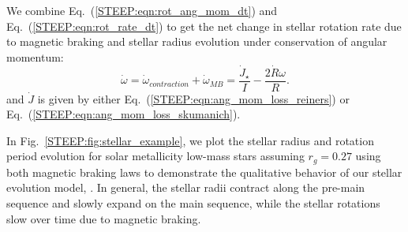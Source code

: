 We combine Eq.~(\ref{STEEP:eqn:rot_ang_mom_dt}) and Eq.~(\ref{STEEP:eqn:rot_rate_dt}) to get the net change in stellar rotation rate due to magnetic braking and stellar radius evolution under conservation of angular momentum:
\begin{equation} \label{STEEP:eqn:stellar_rot_rate_dt}
\dot{\omega} = \dot{\omega}_{contraction} + \dot{\omega}_{MB} = \frac{\dot{J}_{\star}}{I} - \frac{2 \dot{R} \omega}{R}.
\end{equation}
and $\dot{J}$ is given by either Eq.~(\ref{STEEP:eqn:ang_mom_loss_reiners}) or Eq.~(\ref{STEEP:eqn:ang_mom_loss_skumanich}).

In Fig.~\ref{STEEP:fig:stellar_example}, we plot the stellar radius and rotation period evolution for solar metallicity low-mass stars assuming $r_g = 0.27$ using both magnetic braking laws to demonstrate the qualitative behavior of our stellar evolution model, \stellar.  In general, the stellar radii contract along the pre-main sequence and slowly expand on the main sequence, while the stellar rotations slow over time due to magnetic braking.  


